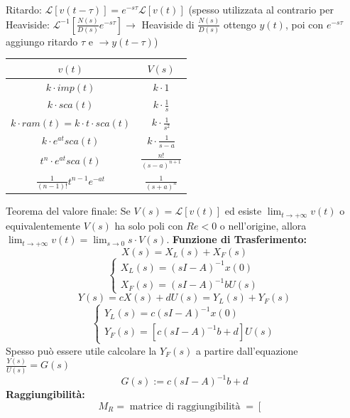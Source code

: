 \begin{landscape}
\begin{multicols*}{3}
Ritardo: $\mathcal{L}[ v(t - \tau)] = e^{-s \tau} \mathcal{L}[v(t)]$ (spesso utilizzata al contrario per Heaviside: $\mathcal{L}^{-1}\left[\frac{N(s)}{D(s)}e^{-s \tau}\right] \rightarrow $ Heaviside di $\frac{N(s)}{D(s)}$ ottengo $y(t)$, poi con $e^{-s \tau}$ aggiungo ritardo $\tau$ e $\rightarrow  y(t- \tau)$)
\renewcommand{\arraystretch}{2}
    \begin{center}
        \begin{tabular}{ |c|c| } 
        \hline
        \;\;\;\;\;\;\;\;\;\;\;\;\;\;\;$v(t)$ \;\;\;\;\;\;\;\;\;\;\;\;\;\;\;& \;\;\;\;\;\;\;\;\;\;\;\;\;\;\;$V(s)$ \;\;\;\;\;\;\;\;\;\;\;\;\;\;\;\\ 
        \hline
        $k \cdot imp(t)$ & $k \cdot 1$ \\ 
        $k \cdot sca(t)$ & $k \cdot \frac{1}{s}$  \\ 
        $k \cdot ram(t) =k \cdot t \cdot  sca(t)$ & $k \cdot \frac{1}{s^2}$ \\
        $k \cdot e^{at}sca(t)$ & $k \cdot \frac{1}{s-a}$ \\ 
        $t^{n}\cdot e^{at}sca(t)$ & $\frac{n!}{(s-a)^{n+1}}$\\ 
        $\frac{1}{(n-1)!} t^{n-1}e^{-at}$ & $\frac{1}{(s+a)^n}$\\
        \hline
        \end{tabular}
    \end{center}
    \renewcommand{\arraystretch}{1}
Teorema del valore finale: Se $V(s) = \mathcal{L}[v(t)]$ ed esiste $\lim_{t\rightarrow +\infty} v(t)$ o equivalentemente $V(s)$ ha solo poli con $Re< 0$ o nell'origine, allora $\lim_{t\rightarrow +\infty} v(t) = \lim_{s\rightarrow 0} s \cdot V(s)$.\newline
\textbf{Funzione di Trasferimento:}
\[
    X(s) = X_L(s) + X_F(s)
\]
\[
    \begin{cases}
        X_L(s) = (sI-A)^{-1} x(0)\\
        X_F(s) = (sI-A) ^{-1} b U(s)
    \end{cases}
\]
\[
    Y(s) = cX(s) + dU(s) = Y_L(s) + Y_F(s)
\]
\[
    \begin{cases}
        Y_L(s) = c(sI-A)^{-1} x(0)\\
        Y_F(s) = [c(sI-A)^{-1} b + d]U(s)
    \end{cases}
\]
Spesso può essere utile calcolare la $Y_F(s)$ a partire dall'equazione $\frac{Y(s)}{U(s)} = G(s)$
\[
    G(s) := c(sI-A)^{-1} b + d
\]
\textbf{Raggiungibilità:}
\[
    M_R= \;\text{matrice di raggiungibilità}\; =\left[\begin{matrix}

\end{matrix}\]
\end{multicols*}
\end{landscape}
